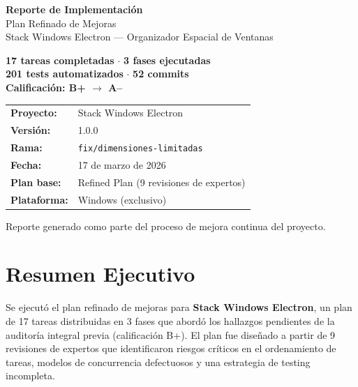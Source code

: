 \documentclass[12pt,a4paper]{article}
\begin{document}
\begin{titlepage}
\centering
\vspace*{3cm}
{\Huge\bfseries\color{sectionblue} Reporte de Implementaci\'on\\[0.5cm]}
{\LARGE\color{sectionblue!70} Plan Refinado de Mejoras\\[0.3cm]}
{\large\color{codegray} Stack Windows Electron --- Organizador Espacial de Ventanas}
\vspace{2cm}
\begin{tcolorbox}[colback=sectionblue!5, colframe=sectionblue, width=12cm]
\centering\large
\textbf{17 tareas completadas} $\cdot$ \textbf{3 fases ejecutadas}\\[0.3cm]
\textbf{201 tests automatizados} $\cdot$ \textbf{52 commits}\\[0.3cm]
\textbf{Calificaci\'on: B+ $\rightarrow$ A--}
\end{tcolorbox}
\vspace{2cm}
\begin{tabular}{ll}
\textbf{Proyecto:} & Stack Windows Electron \\
\textbf{Versi\'on:} & 1.0.0 \\
\textbf{Rama:} & \texttt{fix/dimensiones-limitadas} \\
\textbf{Fecha:} & 17 de marzo de 2026 \\
\textbf{Plan base:} & Refined Plan (9 revisiones de expertos) \\
\textbf{Plataforma:} & Windows (exclusivo) \\
\end{tabular}
\vfill
{\small Reporte generado como parte del proceso de mejora continua del proyecto.}
\end{titlepage}

\tableofcontents
\newpage

\section{Resumen Ejecutivo}

Se ejecut\'o el plan refinado de mejoras para \textbf{Stack Windows Electron}, un plan de 17 tareas distribuidas en 3 fases que abord\'o los hallazgos pendientes de la auditor\'ia integral previa (calificaci\'on B+). El plan fue dise\~nado a partir de 9 revisiones de expertos que identificaron riesgos cr\'iticos en el ordenamiento de tareas, modelos de concurrencia defectuosos y una estrategia de testing incompleta.
\end{document}
